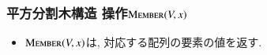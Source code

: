 \documentclass[main]{subfiles}
\begin{document}
\begin{frame}\frametitle{平方分割木構造 操作$\mathrm{\text{M\textsc{ember}}}(V,x)$}
\begin{itemize}
\item $\mathrm{\text{M\textsc{ember}}}(V,x)$は, 対応する配列の要素の値を返す.
\end{itemize}
 

\end{frame}
\end{document}
